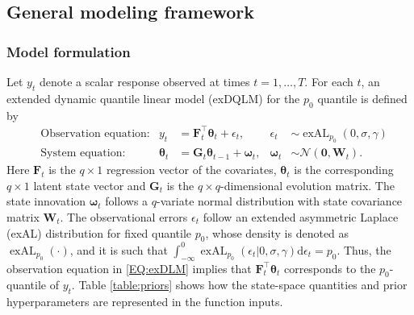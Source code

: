 \documentclass{jss}
\newcommand{\vect}[1]{\boldsymbol{#1}}
\newcommand{\mat}[1]{\mathbf{#1}}
\newcommand{\N}{\mathcal{N}}
\newcommand{\exAL}{\operatorname{exAL}}
\begin{document}
\subsection{General modeling framework}
\subsubsection{Model formulation}
Let \(y_t\) denote a scalar response observed at times \(t=1,\ldots,T\). For each $t$, an extended dynamic quantile linear model (exDQLM) for the $p_0$ quantile is defined by
\begin{align}
\label{EQ:exDLM}
& \text{Observation equation:} & y_t &= \mat{F}_t^\top \vect{\theta}_t + \epsilon_t,  & \epsilon_t & \sim \exAL_{p_0}(0,\sigma,\gamma) \\
\label{EQ:exDLMevo}
& \text{System equation:} & \vect{\theta}_t &= \mat{G}_t \vect{\theta}_{t-1} + \vect{\omega}_t, & \vect{\omega}_t  & \sim \N(\mat{0},\mat{W}_t).
\end{align}
Here $\mat{F}_t$ is the $q \times 1$ regression vector of the covariates, $\vect{\theta}_t$ is the corresponding $q \times 1$ latent state vector and $\mat{G}_t$ is the $q\times q$-dimensional evolution matrix. The state innovation $\vect{\omega}_t$ follows a $q$-variate normal distribution with state covariance matrix $\mat{W}_t.$
The observational errors $\epsilon_t$ follow an extended asymmetric Laplace (exAL) distribution for fixed quantile $p_0$, whose density is denoted as $\exAL_{p_0}(\cdot)$, and it is such that $\int_{-\infty}^0 \exAL_{p_0}(\epsilon_t |0,\sigma,\gamma) \mathrm{d}\epsilon_t = p_0$. Thus, the observation equation in \eqref{EQ:exDLM} implies that $\mat{F}_t^\top \vect{\theta}_t$ corresponds to the $p_0$-quantile of $y_t$. Table \ref{table:priors} shows how the state-space quantities and prior hyperparameters  are represented in the  function inputs.
\end{document}
